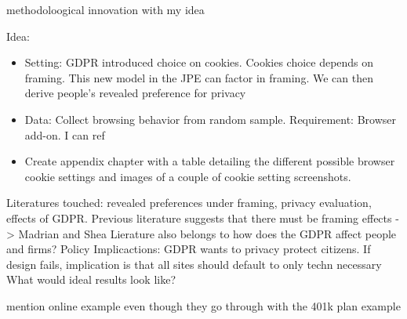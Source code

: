 methodoloogical innovation with my idea




Idea: 
\begin{itemize}
    \item Setting: GDPR introduced choice on cookies. Cookies choice depends on framing. This new model in the JPE can factor in framing. We can then derive people's revealed preference for privacy
    \item Data: Collect browsing behavior from random sample. Requirement: Browser add-on. I can ref
    \item Create appendix chapter with a table detailing the different possible browser cookie settings and images of a couple of cookie setting screenshots.
\end{itemize}


Literatures touched: revealed preferences under framing, privacy evaluation, effects of GDPR.
Previous literature suggests that there must be framing effects -> Madrian and Shea
Lierature also belongs to how does the GDPR affect people and firms?
Policy Implicactions: GDPR wants to privacy protect citizens. If design fails, implication is 
that all sites should default to only techn necessary
What would ideal results look like?

\cite{acquisti2015privacy}  mention online example even though they go through with the 401k plan example